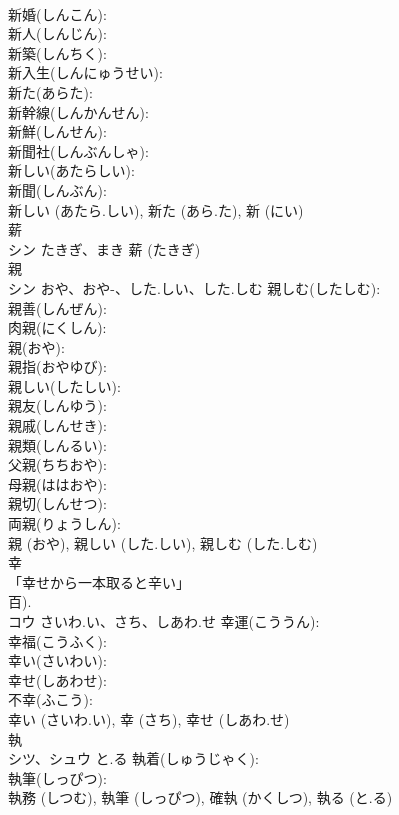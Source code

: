 \documentclass[8pt]{extreport}
\begin{document}
\begin{CJK}{UTF8}{min}
\\	新婚(しんこん): 
\\	新人(しんじん): 
\\	新築(しんちく): 
\\	新入生(しんにゅうせい): 
\\	新た(あらた): 
\\	新幹線(しんかんせん): 
\\	新鮮(しんせん): 
\\	新聞社(しんぶんしゃ): 
\\	新しい(あたらしい): 
\\	新聞(しんぶん): 
\\	新しい (あたら.しい), 新た (あら.た), 新 (にい)
\\	薪			
\\	シン	たきぎ、まき		薪 (たきぎ)
\\	親			
\\	シン	おや、おや-、した.しい、した.しむ	親しむ(したしむ): 
\\	親善(しんぜん): 
\\	肉親(にくしん): 
\\	親(おや): 
\\	親指(おやゆび): 
\\	親しい(したしい): 
\\	親友(しんゆう): 
\\	親戚(しんせき): 
\\	親類(しんるい): 
\\	父親(ちちおや): 
\\	母親(ははおや): 
\\	親切(しんせつ): 
\\	両親(りょうしん): 
\\	親 (おや), 親しい (した.しい), 親しむ (した.しむ)
\\	幸			
\\	「幸せから一本取ると辛い」 
\\	百).	
\\	コウ	さいわ.い、さち、しあわ.せ	幸運(こううん): 
\\	幸福(こうふく): 
\\	幸い(さいわい): 
\\	幸せ(しあわせ): 
\\	不幸(ふこう): 
\\	幸い (さいわ.い), 幸 (さち), 幸せ (しあわ.せ)
\\	執			
\\	シツ、シュウ	と.る	執着(しゅうじゃく): 
\\	執筆(しっぴつ): 
\\	執務 (しつむ), 執筆 (しっぴつ), 確執 (かくしつ), 執る (と.る)

\end{CJK}
\end{document}
